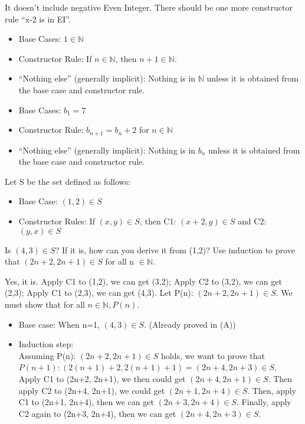 \documentclass[solution, letterpaper]{cs20inclass}
\begin{document}
\begin{solution}
\subsolution  It doesn't include negative Even Integer. There should be one more constructor rule “x-2 is in EI”.
\subsolution 
\begin{itemize}
\item Base Cases:  $1\in \mathbb{N}$
\item Constructor Rule: If $n\in\mathbb{N}$, then $n+1\in\mathbb{N}$.
\item “Nothing else” (generally implicit): Nothing is in $\mathbb{N}$ unless it is obtained from the base case and constructor rule.
\end{itemize}
\subsolution
\begin{itemize}
\item Base Cases:  $b_1=7$
\item Constructor Rule: $b_{n+1}=b_n+2$ for $n\in\mathbb{N}$
\item “Nothing else” (generally implicit): Nothing is in $b_n$ unless it is obtained from the base case and constructor rule.
\end{itemize}
\end{solution}

\problem Let S be the set defined as follows:
\begin{itemize}
\item Base Case: $(1,2) \in S$
\item Constructor Rules: If $(x,y)\in S$, then C1: $(x+2, y) \in S$ and C2: $(y,x) \in S$ 
\end{itemize}
\subproblem Is $(4,3)\in S$? If it is, how can you derive it from (1,2)?
\subproblem Use induction to prove that $(2n+2, 2n+1)\in S$ for all n $\in \mathbb{N}$.

\begin{solution}
\subsolution Yes, it is. Apply C1 to (1,2), we can get (3,2); Apply C2 to (3,2), we can get (2,3); Apply C1 to (2,3), we can get (4,3).
\subsolution Let P(n): $(2n+2, 2n+1)\in S$. We must show that for all $n\in\mathbb{N}, P(n)$.
\begin{itemize}
\item Base case: When n=1, $(4,3)\in S$. (Already proved in (A))
\item Induction step: \\
Assuming P(n): $(2n+2, 2n+1)\in S$ holds, we want to prove that $P(n+1): (2(n+1)+2, 2(n+1)+1)=(2n+4, 2n+3)\in S$.\\
Apply C1 to (2n+2, 2n+1), we then could get $(2n+4, 2n+1)\in S$. Then apply C2 to (2n+4, 2n+1), we could get $(2n+1, 2n+4)\in S$. Then, apply C1 to (2n+1, 2n+4), then we can get $(2n+3, 2n+4)\in S$. Finally, apply C2 again to (2n+3, 2n+4), then we can get $(2n+4, 2n+3)\in S$.
\end{itemize}
\end{solution}
\end{document}
